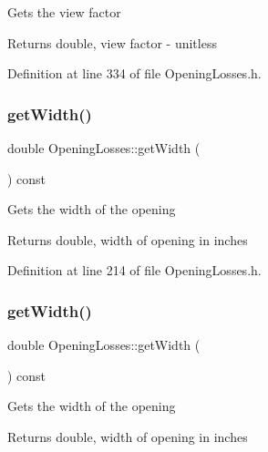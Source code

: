 Gets the view factor

\begin{DoxyReturn}{Returns}
double, view factor -\/ unitless 
\end{DoxyReturn}


Definition at line 334 of file Opening\+Losses.\+h.

\mbox{\label{class_opening_losses_a0374aeac5532188358b5f6ad0f120305}} 
\subsubsection{\texorpdfstring{get\+Width()}{getWidth()}\hspace{0.1cm}{\footnotesize\ttfamily [1/3]}}
{\footnotesize\ttfamily double Opening\+Losses\+::get\+Width (\begin{DoxyParamCaption}{ }\end{DoxyParamCaption}) const\hspace{0.3cm}{\ttfamily [inline]}}

Gets the width of the opening

\begin{DoxyReturn}{Returns}
double, width of opening in inches 
\end{DoxyReturn}


Definition at line 214 of file Opening\+Losses.\+h.

\mbox{\label{class_opening_losses_a0374aeac5532188358b5f6ad0f120305}} 
\subsubsection{\texorpdfstring{get\+Width()}{getWidth()}\hspace{0.1cm}{\footnotesize\ttfamily [2/3]}}
{\footnotesize\ttfamily double Opening\+Losses\+::get\+Width (\begin{DoxyParamCaption}{ }\end{DoxyParamCaption}) const\hspace{0.3cm}{\ttfamily [inline]}}

Gets the width of the opening

\begin{DoxyReturn}{Returns}
double, width of opening in inches 
\end{DoxyReturn}


